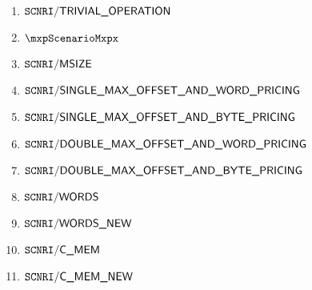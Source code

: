 \begin{enumerate}
	\item $\texttt{SCNRI}\textsf{/}{\textsf{TRIVIAL\_OPERATION}}              $
	\item $\mxpScenarioMxpx                          $
	\item $\texttt{SCNRI}\textsf{/}{\textsf{MSIZE}}                         $
	\item $\texttt{SCNRI}\textsf{/}{\textsf{SINGLE\_MAX\_OFFSET\_AND\_WORD\_PRICING}} $
	\item $\texttt{SCNRI}\textsf{/}{\textsf{SINGLE\_MAX\_OFFSET\_AND\_BYTE\_PRICING}} $
	\item $\texttt{SCNRI}\textsf{/}{\textsf{DOUBLE\_MAX\_OFFSET\_AND\_WORD\_PRICING}} $
	\item $\texttt{SCNRI}\textsf{/}{\textsf{DOUBLE\_MAX\_OFFSET\_AND\_BYTE\_PRICING}} $
	\item $\texttt{SCNRI}\textsf{/}{\textsf{WORDS}}                         $
	\item $\texttt{SCNRI}\textsf{/}{\textsf{WORDS\_NEW}}                      $
	\item $\texttt{SCNRI}\textsf{/}{\textsf{C\_MEM}}                          $
	\item $\texttt{SCNRI}\textsf{/}{\textsf{C\_MEM\_NEW}}                       $
\end{enumerate}
